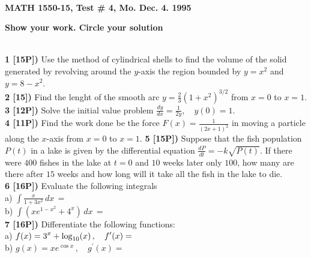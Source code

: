 \documentclass[12pt]{article}
\begin{document}
\\ %
\centerline{\bf MATH 1550-15, Test \# 4, Mo. Dec. 4. 1995}
\centerline{\bf Show your work. Circle your solution}
\\ %
{\bf 1 [15P])} Use the method of cylindrical shells to find
the volume of the solid generated by revolving around the
$y$-axis the region bounded by $y= x^2$ and
$y = 8 - x^2$.
\\ %
{\bf 2 [15])} Find
the lenght of the smooth arc  ${\displaystyle y = \frac{2}{3}\left(1 + x^2\right)^{3/2}}$ from $x=0$ to $x=1$.
\\ %
{\bf 3 [12P])} Solve the initial value problem
${\displaystyle \frac{dy}{dx} = \frac{1}{2y},\quad
y(0) =1}$.
\\ %
{\bf 4 [11P])} Find the work done be the force ${\displaystyle
F(x) = \frac{1}{(2x+1)^2}}$
in moving a particle along the $x$-axis from $x=0$ to $x=1$.
{\bf 5 [15P])} Suppose that the fish population $P(t)$ in a
lake is given by the differential equation
${\displaystyle \frac{dP}{dt} = - k\sqrt{P(t)}}$. If
there were $400$ fishes in the lake at $t=0$ and
$10$ weeks later only
$100$, how many are there after $15$ weeks and how long will it
take all the fish in the lake to die.
\\ %
{\bf 6 [16P])}
Evaluate the following integrals
\\ %
a) ${\displaystyle \int \frac{x}{1 + 3x^2}\, dx \, = }$
\\ %
b) ${\displaystyle \int \left( xe^{1-x^2} + 4^x\right)\, dx \, = }$
\\ %
{\bf 7 [16P])} Differentiate the following functions:
\\ %
a) ${\displaystyle f(x) = 3^x + {\rm log}_{10}(x)\, ,\quad f^\prime (x) =  }$
\\ %
b) ${\displaystyle g(x)  = x e^{\cos x}\, , \quad g^\prime (x) =}$
\end{document}

